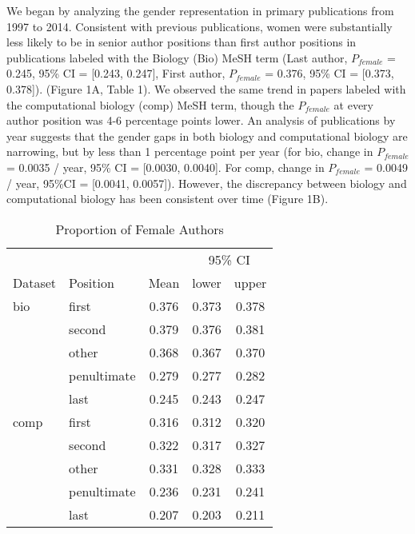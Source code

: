 \documentclass[10pt,letterpaper]{article}
\begin{document}
\begin{flushleft}
We began by analyzing the gender representation in primary publications from 1997 to 2014. Consistent with previous publications, women were substantially less likely to be in senior author positions than first author positions in publications labeled with the Biology (Bio) MeSH term (Last author, $P_{female}$ = 0.245, 95\% CI = [0.243, 0.247], First author, $P_{female}$ = 0.376, 95\% CI = [0.373, 0.378]). (Figure 1A, Table 1). We observed the same trend in papers labeled with the computational biology (comp) MeSH term, though the $P_{female}$ at every author position was 4-6  percentage points lower. An analysis of publications by year suggests that the gender gaps in both biology and computational biology are narrowing, but by less than 1 percentage point  per year (for bio, change in $P_{female}$ = 0.0035 / year, 95\% CI = [0.0030, 0.0040]. For comp, change in $P_{female}$ = 0.0049 / year, 95\%CI = [0.0041, 0.0057]). However, the discrepancy between biology and computational biology has been consistent over time (Figure 1B).

\begin{table}[]
\centering
\caption{Proportion of Female Authors}
\label{Table 1}
\begin{tabular}{llccc}
\toprule
        &               &       & \multicolumn{2}{c}{95\% CI} \\
\cmidrule(r){4-5}
Dataset & Position      & Mean  & lower        & upper        \\
\midrule
bio     & first         & 0.376 & 0.373        & 0.378        \\
        & second        & 0.379 & 0.376        & 0.381        \\
        & other         & 0.368 & 0.367        & 0.370        \\
        & penultimate   & 0.279 & 0.277        & 0.282        \\
        & last          & 0.245 & 0.243        & 0.247        \\
comp    & first         & 0.316 & 0.312        & 0.320        \\
        & second        & 0.322 & 0.317        & 0.327        \\
        & other         & 0.331 & 0.328        & 0.333        \\
        & penultimate   & 0.236 & 0.231        & 0.241        \\
        & last          & 0.207 & 0.203        & 0.211        \\
\bottomrule
\end{tabular}
\end{table}


\end{flushleft}
\end{document}

